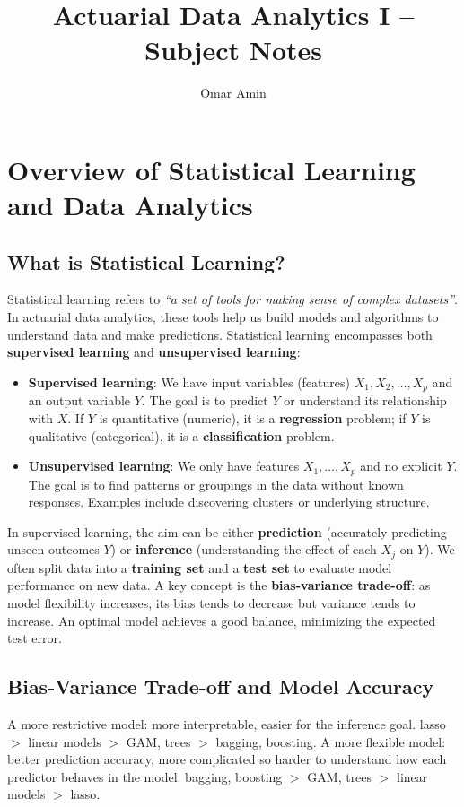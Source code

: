 \documentclass[11pt]{article}
\begin{document}
\title{Actuarial Data Analytics I -- Subject Notes}
\author{Omar Amin}
\date{}
\maketitle

\tableofcontents

\newpage

\section{Overview of Statistical Learning and Data Analytics}
\subsection{What is Statistical Learning?}
Statistical learning refers to \textit{``a set of tools for making sense of complex datasets''}. In actuarial data analytics, these tools help us build models and algorithms to understand data and make predictions. Statistical learning encompasses both \textbf{supervised learning} and \textbf{unsupervised learning}: \\
\begin{itemize}
    \item \textbf{Supervised learning}: We have input variables (features) $X_1, X_2, \ldots, X_p$ and an output variable $Y$. The goal is to predict $Y$ or understand its relationship with $X$. If $Y$ is quantitative (numeric), it is a \textbf{regression} problem; if $Y$ is qualitative (categorical), it is a \textbf{classification} problem.
    \item \textbf{Unsupervised learning}: We only have features $X_1,\ldots,X_p$ and no explicit $Y$. The goal is to find patterns or groupings in the data without known responses. Examples include discovering clusters or underlying structure. 
\end{itemize} \phantom{i}

\noindent In supervised learning, the aim can be either \textbf{prediction} (accurately predicting unseen outcomes $Y$) or \textbf{inference} (understanding the effect of each $X_j$ on $Y$). We often split data into a \textbf{training set} and a \textbf{test set} to evaluate model performance on new data. A key concept is the \textbf{bias-variance trade-off}: as model flexibility increases, its bias tends to decrease but variance tends to increase. An optimal model achieves a good balance, minimizing the expected test error.

\subsection{Bias-Variance Trade-off and Model Accuracy}
\noindent A more restrictive model: more interpretable, easier for the inference goal. lasso $>$ linear models $>$ GAM, trees $>$ bagging, boosting. A more flexible model: better prediction accuracy, more complicated so harder to understand how each predictor behaves in the model. bagging, boosting $>$ GAM, trees $>$ linear models $>$ lasso. \\
\end{document}
